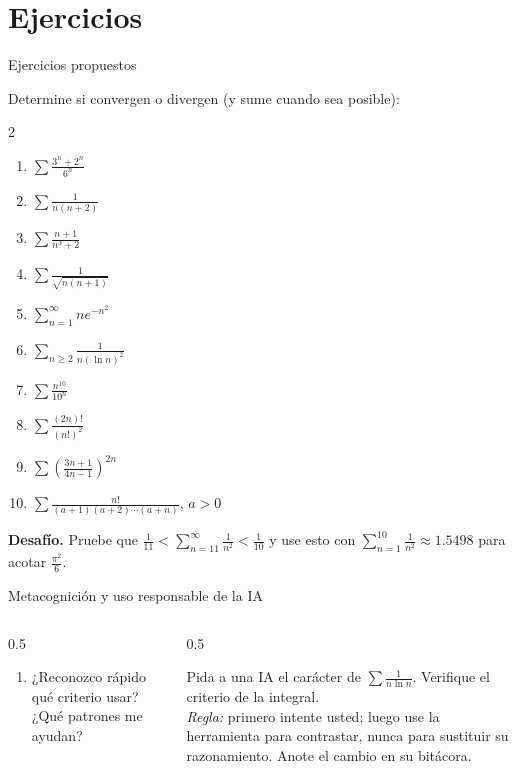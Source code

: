 \documentclass[10pt,aspectratio=169]{beamer}
\begin{document}
\section{Ejercicios}

\begin{frame}{Ejercicios propuestos}
  \small
  \begin{ejercicio}
    Determine si convergen o divergen (y sume cuando sea posible):
    \begin{multicols}{2}
    \begin{enumerate}
      \item $\displaystyle\sum\frac{3^{n}+2^{n}}{6^n}$
      \item $\displaystyle\sum\frac{1}{n(n+2)}$
      \item $\displaystyle\sum\frac{n+1}{n^3+2}$
      \item $\displaystyle\sum\frac{1}{\sqrt{n(n+1)}}$
      \item $\displaystyle\sum_{n=1}^\infty ne^{-n^2}$
      \item $\displaystyle\sum_{n\ge2}\frac{1}{n(\ln n)^2}$
      \item $\displaystyle\sum\frac{n^{10}}{10^n}$
      \item $\displaystyle\sum\frac{(2n)!}{(n!)^2}$
      \item $\displaystyle\sum\left(\frac{3n+1}{4n-1}\right)^{2n}$
      \item $\displaystyle\sum\frac{n!}{(a+1)(a+2)\cdots(a+n)}$, $a>0$
    \end{enumerate}
    \end{multicols}
  \end{ejercicio}
  \textbf{Desafío.} Pruebe que $\displaystyle\frac1{11}<\sum_{n=11}^\infty\frac1{n^2}<\frac1{10}$ y use esto con
  $\sum_{n=1}^{10}\frac1{n^2}\approx1.5498$ para acotar $\frac{\pi^2}{6}$.
\end{frame}

\begin{frame}{Metacognición y uso responsable de la IA}
  \small
  \begin{columns}[t]
    \begin{column}{0.5\textwidth}
      \begin{metacog}
        \begin{enumerate}
          \metacomun
          \item ¿Reconozco rápido qué criterio usar? ¿Qué patrones me ayudan?
        \end{enumerate}
      \end{metacog}
    \end{column}
    \begin{column}{0.5\textwidth}
      \begin{iabox}
        Pida a una IA el carácter de $\sum\frac1{n\ln n}$. Verifique el criterio de la integral.\\[2pt]
        \textit{Regla:} primero intente usted; luego use la herramienta para contrastar, nunca para sustituir su razonamiento. Anote el cambio en su bitácora.
      \end{iabox}
    \end{column}
  \end{columns}
\end{frame}
\end{document}
